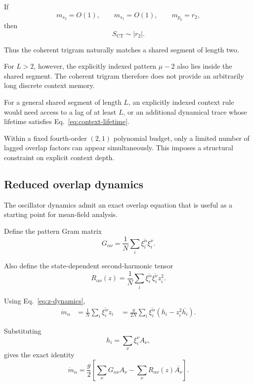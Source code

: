 If
\begin{equation}
m_{s_2}=O(1),
\qquad
m_{s_1}=O(1),
\qquad
m_{p_b}=r_2,
\end{equation}
then
\begin{equation}
S_{\mathrm{CT}}
\sim
|r_2|.
\end{equation}

Thus the coherent trigram naturally matches a shared segment of length two.

For $L>2$, however, the explicitly indexed pattern $\mu-2$ also lies inside
the shared segment.  The coherent trigram therefore does not provide an
arbitrarily long discrete context memory.

For a general shared segment of length $L$, an explicitly indexed context rule
would need access to a lag of at least $L$, or an additional dynamical trace
whose lifetime satisfies Eq.~\eqref{eq:context-lifetime}.

Within a fixed fourth-order $(2,1)$ polynomial budget, only a limited number of
lagged overlap factors can appear simultaneously.  This imposes a structural
constraint on explicit context depth.

\subsection{Reduced overlap dynamics}

The oscillator dynamics admit an exact overlap equation that is useful as a
starting point for mean-field analysis.

Define the pattern Gram matrix
\begin{equation}
G_{\alpha\nu}
=
\frac{1}{N}
\sum_i
\overline{\xi_i^\alpha}\xi_i^\nu.
\end{equation}

Also define the state-dependent second-harmonic tensor
\begin{equation}
R_{\alpha\nu}(z)
=
\frac{1}{N}
\sum_i
\overline{\xi_i^\alpha}
\overline{\xi_i^\nu}
z_i^2.
\label{eq:R-definition}
\end{equation}

Using Eq.~\eqref{eq:z-dynamics},
\begin{align}
\dot m_\alpha
&=
\frac{1}{N}
\sum_i
\overline{\xi_i^\alpha}\dot z_i
\
&=
\frac{g}{2N}
\sum_i
\overline{\xi_i^\alpha}
\left(
h_i-z_i^2\overline{h_i}
\right).
\end{align}

Substituting
\begin{equation}
h_i
=
\sum_\nu
\xi_i^\nu A_\nu,
\end{equation}
gives the exact identity
\begin{equation}
\boxed{
\dot m_\alpha
=
\frac{g}{2}
\left[
\sum_\nu
G_{\alpha\nu}A_\nu
-
\sum_\nu
R_{\alpha\nu}(z)
\overline{A_\nu}
\right].
}
\label{eq:exact-overlap-dynamics}
\end{equation}

